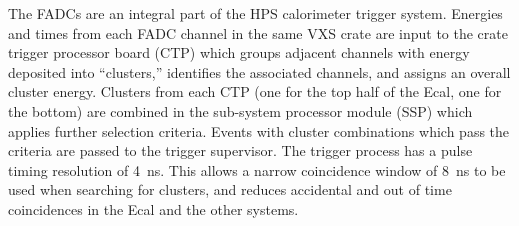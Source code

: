 The FADCs are an integral part of the HPS calorimeter trigger system. Energies  
and times from each FADC channel in the same VXS crate are input to the crate trigger
processor board (CTP) which groups adjacent channels with energy deposited into ``clusters,'' identifies the associated channels, and
assigns an overall cluster energy. Clusters  
from each CTP (one for the top half of the Ecal, one for the bottom) are combined in the sub-system processor module (SSP) 
which applies further selection criteria. Events with cluster combinations which pass the criteria are
passed to the trigger supervisor. The trigger process has a pulse timing resolution of 4~ns. This allows a narrow 
coincidence window of 8~ns to be used when searching for clusters, and reduces accidental and out of time coincidences in the Ecal
and the other systems. 





